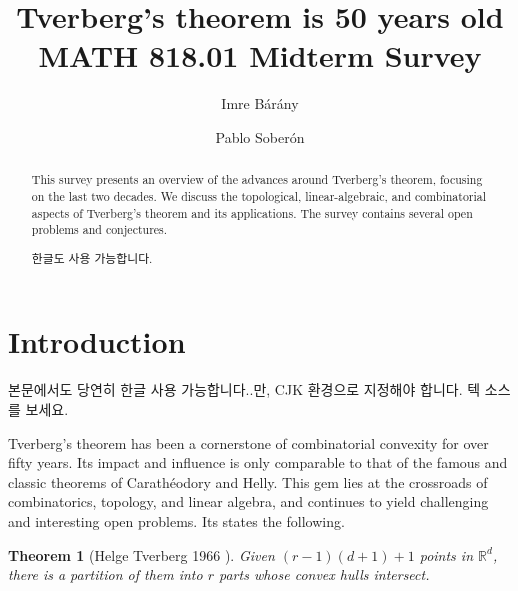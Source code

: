 \documentclass[11pt]{article}
\title{Tverberg's theorem is 50 years old\\
	\large MATH 818.01 Midterm Survey
}
\author{Imre B\'ar\'any \and Pablo Sober\'on}
\date{}
\newtheorem{theorem}{Theorem}
\newcommand{\rr}{\mathbb{R}}
\DeclareMathOperator{\conv}{conv}
\begin{document}
	
	\maketitle
	
	\begin{abstract}
		This survey presents an overview of the advances around Tverberg's theorem, focusing on the last two decades.  We discuss the topological, linear-algebraic, and combinatorial aspects of Tverberg's theorem and its applications.  The survey contains several open problems and conjectures.
		\begin{CJK}{UTF8}{mj}
			한글도 사용 가능합니다.
		\end{CJK}
	\end{abstract}
	
	\section{Introduction}\label{section-introduction}
	
	\begin{CJK}{UTF8}{mj}
		본문에서도 당연히 한글 사용 가능합니다..만, CJK 환경으로 지정해야 합니다. 텍 소스를 보세요.
	\end{CJK}
	
	Tverberg's theorem has been a cornerstone of combinatorial convexity for over fifty years. Its impact and influence is only comparable to that of the famous and classic theorems of Carath\'eodory and Helly. This gem lies at the crossroads of combinatorics, topology, and linear algebra, and continues to yield challenging and interesting open problems.  Its states the following.%
	
	\begin{theorem}[Helge Tverberg 1966 \cite{Tverberg:1966tb}]
		Given $(r-1)(d+1)+1$ points in $\rr^d$, there is a partition of them into $r$ parts whose convex hulls intersect.
	\end{theorem}
	
\end{document}
